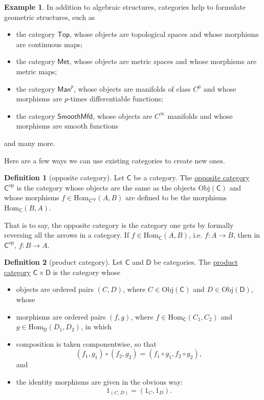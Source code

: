\documentclass[a4paper,10pt]{scrreprt}
\newcommand{\defn}[1]{\ul{#1}}
\newcommand{\Obj}{\mathrm{Obj}}
\newcommand{\Hom}{\mathrm{Hom}}
\theoremstyle{definition}
\newtheorem{definition}{Definition}[section]
\newtheorem{example}{Example}[section]
\theoremstyle{plain}
\theoremstyle{remark}
\begin{document}
\begin{example}
  \label{eg:moreexamplesofcategories}
  In addition to algebraic structures, categories help to formulate geometric structures, such as
  \begin{itemize}
    \item the category $\mathsf{Top}$, whose objects are topological spaces and whose morphisms are continuous maps;
    \item the category $\mathsf{Met}$, whose objects are metric spaces and whose morphisms are metric maps;
    \item the category $\mathsf{Man}^{p}$, whose objects are manifolds of class $C^{p}$ and whose morphisms are $p$-times differentiable functions;

    \item the category $\mathsf{SmoothMfd}$, whose objects are $C^{\infty}$ manifolds and whose morphisms are smooth functions
  \end{itemize}
  and many more.
\end{example}

Here are a few ways we can use existing categories to create new ones.
\begin{definition}[opposite category]
  \label{def:oppositecategory}
  Let $\mathsf{C}$ be a category. The \defn{opposite category} $\mathsf{C}^{\mathrm{op}}$ is the category whose objects are the same as the objects $\Obj(\mathsf{C})$ and whose morphisms $f \in \Hom_{\mathsf{C}^{\mathrm{op}}}(A, B)$ are defined to be the morphisms $\Hom_{\mathsf{C}}(B, A)$.

  That is to say, the opposite category is the category one gets by formally reversing all the arrows in a category. If $f \in \Hom_{\mathsf{C}}(A, B)$, i.e. $f \colon A \to B$, then in $\mathsf{C}^{\mathrm{op}}$, $f\colon B \to A$. 
\end{definition} 

\begin{definition}[product category]
  \label{def:productcategory}
  Let $\mathsf{C}$ and $\mathsf{D}$ be categories. The \defn{product category} $\mathsf{C} \times \mathsf{D}$ is the category whose 
  \begin{itemize}
    \item objects are ordered pairs $(C, D)$, where $C \in \Obj(\mathsf{C})$ and $D \in \Obj(\mathsf{D})$, whose
    \item morphisms are ordered pairs $(f,g)$, where $f \in \Hom_{\mathsf{C}}(C_{1}, C_{2})$ and $g \in \Hom_{\mathsf{D}}(D_{1}, D_{2})$, in which
    \item composition is taken componentwise, so that
      \begin{equation*}
        (f_{1}, g_{1}) \circ (f_{2},g_{2}) = (f_{1} \circ g_{1}, f_{2} \circ g_{2}),
      \end{equation*}
      and
    \item the identity morphisms are given in the obvious way:
      \begin{equation*}
        1_{(C,D)} = (1_{C}, 1_{D}).
      \end{equation*}
  \end{itemize}
\end{definition}
\end{document}
